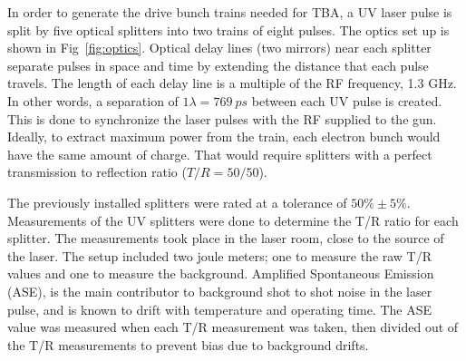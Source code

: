 \documentclass{iitthesis}
\begin{document}
In order to generate the drive bunch trains needed for TBA, a UV laser pulse is split 
by five optical splitters into two trains of eight pulses. 
The optics set up is shown in Fig~\ref{fig:optics}. Optical delay lines (two mirrors) near each splitter 
separate pulses in space and time by extending the distance that each pulse travels. 
The length of each delay line is a multiple of the RF frequency, 1.3 GHz. 
In other words, a separation of $1\lambda=\SI{769}{ps}$ between each UV pulse is created. 
This is done to synchronize the laser pulses with the RF supplied to the gun.
Ideally, to extract maximum power from the train, each electron bunch would have the same amount of charge. 
That would require splitters with a perfect transmission to reflection ratio ($T/R = 50/50$).

The previously installed splitters were rated at a tolerance of $50\%\pm5\%$.
Measurements of the UV splitters were done to determine the T/R ratio for 
each splitter. The measurements took place in the laser room, close to the source of the laser.
The setup included two joule meters; one to measure the raw T/R values and one to measure 
the background. Amplified Spontaneous Emission (ASE), 
is the main contributor to background shot to shot noise in the laser pulse,
and is known to drift with temperature and operating time. 
The ASE value was measured when each T/R measurement was taken, then divided out of the T/R 
measurements to prevent bias due to background drifts. 
\end{document}
